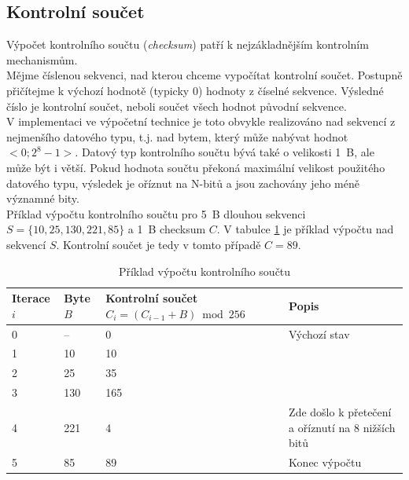 \subsection{Kontrolní součet}
\label{subsec:checksum}
Výpočet kontrolního součtu (\textit{checksum}) patří k nejzákladnějším kontrolním mechanismům.\\
Mějme číslenou sekvenci, nad kterou chceme vypočítat kontrolní součet. Postupně přičítejme k výchozí hodnotě (typicky 0) hodnoty z číselné sekvence. Výsledné číslo je kontrolní součet, neboli součet všech hodnot původní sekvence.\\
V implementaci ve výpočetní technice je toto obvykle realizováno nad sekvencí z nejmenšího datového typu, t.j. nad bytem, který může nabývat hodnot $<0;2^{8}-1>$. Datový typ kontrolního součtu bývá také o velikosti 1~B, ale může být i větší. Pokud hodnota součtu překoná maximální velikost použitého datového typu, výsledek je oříznut na N-bitů a jsou zachovány jeho méně významné bity.\\
Příklad výpočtu kontrolního součtu pro 5~B dlouhou sekvenci $S=\{10, 25, 130, 221, 85\}$ a 1~B checksum $C$.
V tabulce \ref{tab:checksum-example} je příklad výpočtu nad sekvencí $S$. Kontrolní součet je tedy v tomto případě $C=89$.
\begin{table}[h]
    \centering
    \begin{tabular}{ | l | l | l | l | }
        \hline
        Iterace $i$ & Byte $B$  & \makecell{Kontrolní součet\\$C_{i}=(C_{i-1}+B) \bmod 256$}  & Popis \\ \hline\hline
        0           & --        & 0                                 & Výchozí stav \\ \hline
        1           & 10        & 10                                & \\\hline
        2           & 25        & 35                                & \\\hline
        3           & 130       & 165                               & \\\hline
        4           & 221       & 4                                 & Zde došlo k přetečení a oříznutí na 8 nižších bitů \\\hline
        5           & 85        & 89                                & Konec výpočtu \\\hline
    \end{tabular}
    \label{tab:checksum-example}
    \caption{Příklad výpočtu kontrolního součtu}
\end{table}

